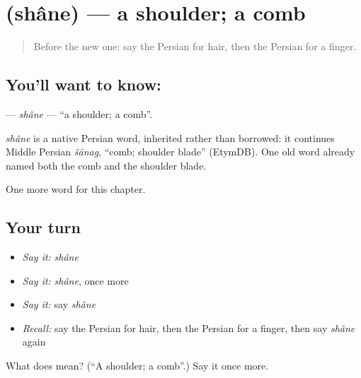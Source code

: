 \section[\texorpdfstring{\fa{شانه} (shâne)}{شانه (shâne)}]{ (shâne) — a shoulder; a comb}

\label{lesson:FA-C28-shane}



\begin{quote}
Before the new one: say the Persian for hair, then the Persian for a finger.
\end{quote}

\subsection*{You'll want to know: }
\textbf{} — \emph{shâne} — \textquotedblleft{}a shoulder; a comb\textquotedblright{}.

\begin{cousinweb}
\emph{shâne} is a native Persian word, inherited rather than borrowed: it continues Middle Persian \emph{šānag}, \textquotedblleft{}comb; shoulder blade\textquotedblright{} (EtymDB). One old word already named both the comb and the shoulder blade.
\end{cousinweb}

\begin{grammarlens}[title={What you've built}]
One more word for this chapter.
\end{grammarlens}

\subsection*{Your turn}
\begin{itemize}
\raggedright
  \item \emph{Say it:} \emph{shâne}
  \item \emph{Say it:} \emph{shâne}, once more
  \item \emph{Say it:} say \emph{shâne}
  \item \emph{Recall:} say the Persian for hair, then the Persian for a finger, then say \emph{shâne} again
\end{itemize}

\begin{tcolorbox}[breakable,colback=teal!4,colframe=teal!35!black,title={Before you move on}]
What does  mean? (\textquotedblleft{}A shoulder; a comb\textquotedblright{}.) Say it once more.
\end{tcolorbox}
